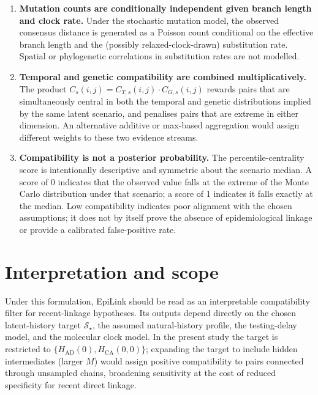 \documentclass[11pt,a4paper]{article}
\begin{document}
\begin{enumerate}
	\item \textbf{Mutation counts are conditionally independent given branch length and clock rate.}
	      Under the stochastic mutation model, the observed consensus distance is generated as a Poisson count conditional on the effective branch length and the (possibly relaxed-clock-drawn) substitution rate. Spatial or phylogenetic correlations in substitution rates are not modelled.

	\item \textbf{Temporal and genetic compatibility are combined multiplicatively.}
	      The product $C_s(i,j) = C_{T,s}(i,j)\cdot C_{G,s}(i,j)$ rewards pairs that are simultaneously central in both the temporal and genetic distributions implied by the same latent scenario, and penalises pairs that are extreme in either dimension. An alternative additive or max-based aggregation would assign different weights to these two evidence streams.

	\item \textbf{Compatibility is not a posterior probability.}
	      The percentile-centrality score is intentionally descriptive and symmetric about the scenario median. A score of 0 indicates that the observed value falls at the extreme of the Monte Carlo distribution under that scenario; a score of 1 indicates it falls exactly at the median. Low compatibility indicates poor alignment with the chosen assumptions; it does not by itself prove the absence of epidemiological linkage or provide a calibrated false-positive rate.

\end{enumerate}

\section{Interpretation and scope}\label{sec:S1_interpretation}

Under this formulation, EpiLink should be read as an interpretable compatibility filter for recent-linkage hypotheses. Its outputs depend directly on the chosen latent-history target $\mathcal{S}_\star$, the assumed natural-history profile, the testing-delay model, and the molecular clock model. In the present study the target is restricted to $\{H_{\mathrm{AD}}(0), H_{\mathrm{CA}}(0,0)\}$; expanding the target to include hidden intermediates (larger $M$) would assign positive compatibility to pairs connected through unsampled chains, broadening sensitivity at the cost of reduced specificity for recent direct linkage.
\end{document}
